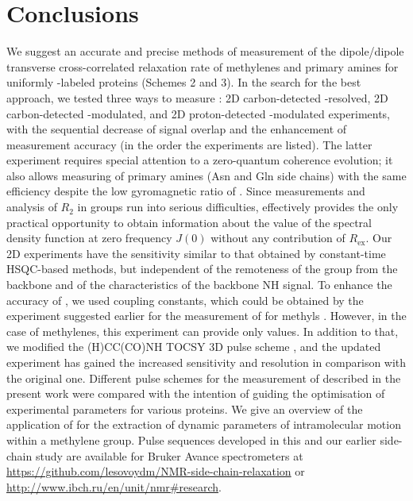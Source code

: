 \documentclass[twocolumn]{svjour3}           %
\begin{document}
\section{Conclusions}
\label{seq:conclusions}
We suggest an accurate and precise methods of measurement of the dipole/dipole 
transverse cross-correlated relaxation rate \gtwoXH{} of methylenes and primary 
amines for uniformly \nclab-labeled proteins (Schemes 2 and 3). In the search for the 
best approach, we tested three ways to measure \gtwoCH: 2D carbon-detected 
\oneJch-resolved, 2D carbon-detected \oneJch-modulated, and 2D proton-detected
\oneJxh-modulated experiments, with the sequential decrease of signal overlap 
and the enhancement of measurement accuracy (in the order the experiments are 
listed). The latter experiment requires special attention to a zero-quantum coherence evolution; it 
also allows measuring \gtwoNH{} of primary amines (Asn and Gln side chains) 
with the same efficiency despite the low gyromagnetic ratio of \nlab.
Since measurements and analysis of $R_2$ in \XHtwo{} groups run into serious difficulties, \gtwo{} 
effectively provides the only practical opportunity to obtain information about the 
value of the spectral density function at zero frequency $J(0)$ without any 
contribution of $R_\text{ex}$. Our 2D experiments have the sensitivity similar 
to that obtained by constant-time {HSQC}-based methods, but independent 
of the remoteness of the \CHtwo{} group from the backbone and of the 
characteristics of the backbone NH signal. To enhance the accuracy of \gtwoCH{}, 
we used \oneJch{} coupling constants, which could be obtained by the experiment
suggested earlier for the measurement of \gtwoCH{} for methyls 
\cite{zhang_probing_2006}. However, in the case of methylenes, this experiment 
can provide only \oneJch{} values. In addition to that, we modified the 
{(H)CC(CO)NH} {TOCSY} 3D pulse scheme \cite{zheng_measurement_2004}, and the 
updated experiment has gained the increased sensitivity and resolution in 
comparison with the original one. Different pulse schemes for the measurement 
of \gtwoXH{} described in the present work were compared with the intention 
of guiding the optimisation of experimental parameters for various proteins. 
We give an overview of the application of \gtwoCH{} for the extraction of 
dynamic parameters of intramolecular motion within a methylene group. 
Pulse sequences developed in this and our earlier side-chain study \cite{lesovoy_nmr_2017} are available for 
Bruker Avance spectrometers at \url{https://github.com/lesovoydm/NMR-side-chain-relaxation} or \url{http://www.ibch.ru/en/unit/nmr#research}. 
\end{document}
